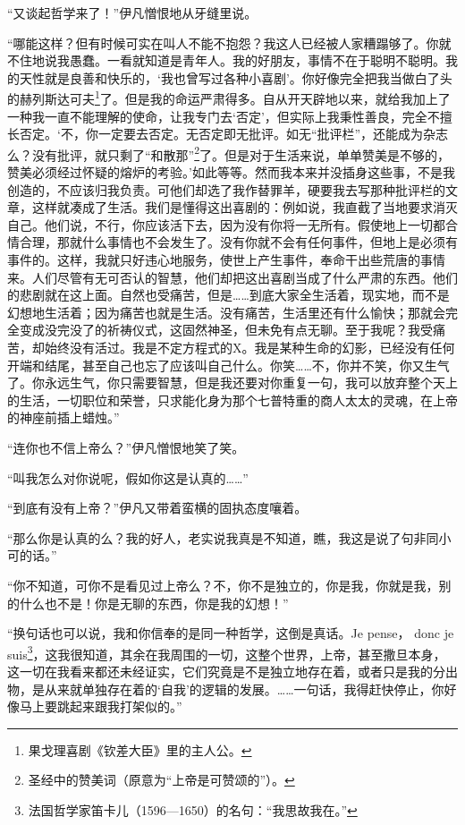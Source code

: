 \par “又谈起哲学来了！”伊凡憎恨地从牙缝里说。
\par “哪能这样？但有时候可实在叫人不能不抱怨？我这人已经被人家糟蹋够了。你就不住地说我愚蠢。一看就知道是青年人。我的好朋友，事情不在于聪明不聪明。我的天性就是良善和快乐的，‘我也曾写过各种小喜剧’。你好像完全把我当做白了头的赫列斯达可夫\footnote{果戈理喜剧《钦差大臣》里的主人公。}了。但是我的命运严肃得多。自从开天辟地以来，就给我加上了一种我一直不能理解的使命，让我专门去‘否定’，但实际上我秉性善良，完全不擅长否定。‘不，你一定要去否定。无否定即无批评。如无“批评栏”，还能成为杂志么？没有批评，就只剩了“和散那”\footnote{圣经中的赞美词（原意为“上帝是可赞颂的”）。}了。但是对于生活来说，单单赞美是不够的，赞美必须经过怀疑的熔炉的考验。’如此等等。然而我本来并没插身这些事，不是我创造的，不应该归我负责。可他们却选了我作替罪羊，硬要我去写那种批评栏的文章，这样就凑成了生活。我们是懂得这出喜剧的：例如说，我直截了当地要求消灭自己。他们说，不行，你应该活下去，因为没有你将一无所有。假使地上一切都合情合理，那就什么事情也不会发生了。没有你就不会有任何事件，但地上是必须有事件的。这样，我就只好违心地服务，使世上产生事件，奉命干出些荒唐的事情来。人们尽管有无可否认的智慧，他们却把这出喜剧当成了什么严肃的东西。他们的悲剧就在这上面。自然也受痛苦，但是……到底大家全生活着，现实地，而不是幻想地生活着；因为痛苦也就是生活。没有痛苦，生活里还有什么愉快；那就会完全变成没完没了的祈祷仪式，这固然神圣，但未免有点无聊。至于我呢？我受痛苦，却始终没有活过。我是不定方程式的X。我是某种生命的幻影，已经没有任何开端和结尾，甚至自己也忘了应该叫自己什么。你笑……不，你并不笑，你又生气了。你永远生气，你只需要智慧，但是我还要对你重复一句，我可以放弃整个天上的生活，一切职位和荣誉，只求能化身为那个七普特重的商人太太的灵魂，在上帝的神座前插上蜡烛。”
\par “连你也不信上帝么？”伊凡憎恨地笑了笑。
\par “叫我怎么对你说呢，假如你这是认真的……”
\par “到底有没有上帝？”伊凡又带着蛮横的固执态度嚷着。
\par “那么你是认真的么？我的好人，老实说我真是不知道，瞧，我这是说了句非同小可的话。”
\par “你不知道，可你不是看见过上帝么？不，你不是独立的，你是我，你就是我，别的什么也不是！你是无聊的东西，你是我的幻想！”
\par “换句话也可以说，我和你信奉的是同一种哲学，这倒是真话。Je pense， donc je suis\footnote{法国哲学家笛卡儿（1596—1650）的名句：“我思故我在。”}，这我很知道，其余在我周围的一切，这整个世界，上帝，甚至撒旦本身，这一切在我看来都还未经证实，它们究竟是不是独立地存在着，或者只是我的分出物，是从来就单独存在着的‘自我’的逻辑的发展。……一句话，我得赶快停止，你好像马上要跳起来跟我打架似的。”
